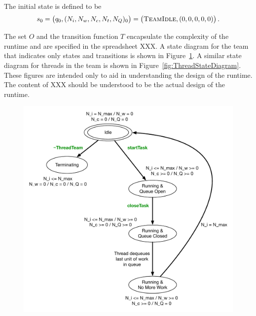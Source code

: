 \documentclass{article}
\newcommand{\TeamIdle}          {\textsc{TeamIdle}}
\begin{document}
The initial state is defined to be
\[
s_0 = \left(q_0, (N_i, N_w, N_c, N_t, N_Q)_0\right) = \left(\TeamIdle, (0, 0, 0, 0, 0)\right).
\]

The set $O$ and the transition function $T$ encapsulate the complexity of the
runtime and are specified in the spreadsheet XXX.  A state diagram for the team
that indicates only states and transitions is shown in
Figure~\ref{fig:TeamStateDiagram}.  A similar state diagram for threads in the
team is shown in Figure~\ref{fig:ThreadStateDiagram}.  These figures are
intended only to aid in understanding the design of the runtime.  The content of
XXX should be understood to be the actual design of the runtime.

\begin{figure}[!ht]
\begin{center}
\includegraphics[width=5.0in]{TeamStates.pdf}
\caption[]{}
\label{fig:TeamStateDiagram}
\end{center}
\end{figure}
\end{document}
